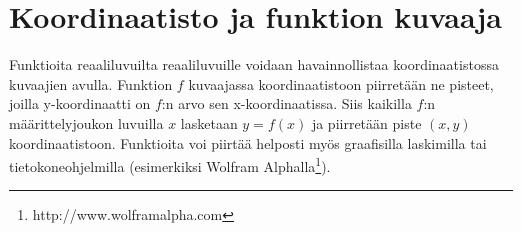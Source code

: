 \chapter{Koordinaatisto ja funktion kuvaaja}
Funktioita reaaliluvuilta reaaliluvuille voidaan havainnollistaa koordinaatistossa kuvaajien avulla. Funktion $f$ kuvaajassa koordinaatistoon piirretään ne pisteet, joilla y-koordinaatti on $f$:n arvo sen x-koordinaatissa. Siis kaikilla $f$:n määrittelyjoukon luvuilla $x$ lasketaan $y = f(x)$ ja piirretään piste $(x, y)$ koordinaatistoon. Funktioita voi piirtää helposti myös graafisilla laskimilla tai tietokoneohjelmilla (esimerkiksi Wolfram Alphalla\footnote{http://www.wolframalpha.com}).

\def\vcent#1{\mathsurround0pt$\vcenter{\hbox{#1}}$}


